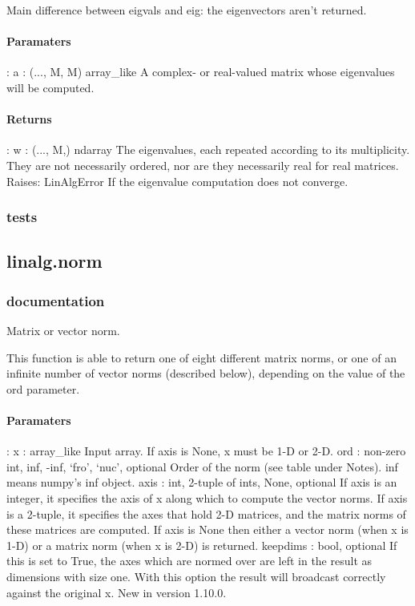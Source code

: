 Main difference between eigvals and eig: the eigenvectors aren’t returned.


\paragraph{Paramaters}: 
a : (..., M, M) array\_like
A complex- or real-valued matrix whose eigenvalues will be computed.\\
\paragraph{Returns}:    
w : (..., M,) ndarray
The eigenvalues, each repeated according to its multiplicity. They are not necessarily ordered, nor are they necessarily real for real matrices.\\
Raises: 
LinAlgError
If the eigenvalue computation does not converge.\\
\subsubsection{tests}
\subsection{linalg.norm}
\subsubsection{documentation}
Matrix or vector norm.

This function is able to return one of eight different matrix norms, or one of an infinite number of vector norms (described below), depending on the value of the ord parameter.\\

\paragraph{Paramaters}: 
x : array\_like
Input array. If axis is None, x must be 1-D or 2-D.
ord : {non-zero int, inf, -inf, ‘fro’, ‘nuc’}, optional
Order of the norm (see table under Notes). inf means numpy’s inf object.
axis : {int, 2-tuple of ints, None}, optional
If axis is an integer, it specifies the axis of x along which to compute the vector norms. If axis is a 2-tuple, it specifies the axes that hold 2-D matrices, and the matrix norms of these matrices are computed. If axis is None then either a vector norm (when x is 1-D) or a matrix norm (when x is 2-D) is returned.
keepdims : bool, optional
If this is set to True, the axes which are normed over are left in the result as dimensions with size one. With this option the result will broadcast correctly against the original x.
New in version 1.10.0.\\

